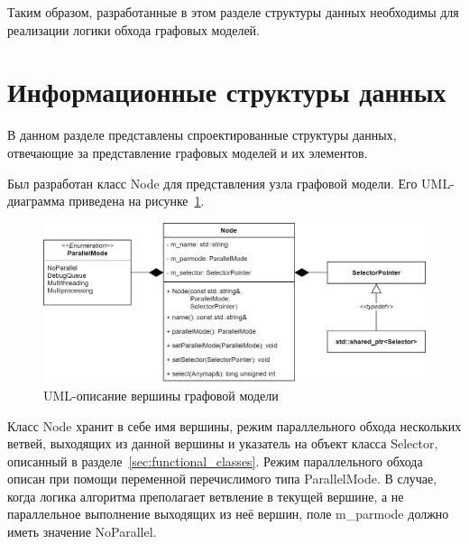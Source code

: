 Таким образом, разработанные в этом разделе структуры данных необходимы для реализации логики обхода графовых моделей.

\section{Информационные структуры данных}
В данном разделе представлены спроектированные структуры данных, отвечающие за представление графовых моделей и их элементов.

Был разработан класс \textsf{Node} для представления узла графовой модели. Его UML-диаграмма приведена на рисунке~\ref{fig:UMLNode}.
\begin{figure}[!ht]
    \centering
    \includegraphics[height=0.25\textheight]{figures/class.node_v2.png}
    \caption{UML-описание вершины графовой модели}
    \label{fig:UMLNode}
\end{figure}

Класс \textsf{Node} хранит в себе имя вершины, режим параллельного обхода нескольких ветвей, выходящих из данной вершины и указатель на объект класса \textsf{Selector}, описанный в разделе~\ref{sec:functional_classes}. Режим параллельного обхода описан при помощи переменной перечислимого типа \textsf{ParallelMode}. В случае, когда логика алгоритма преполагает ветвление в текущей вершине, а не параллельное выполнение выходящих из неё вершин, поле \textsf{m_parmode} должно иметь значение \textsf{NoParallel}.

